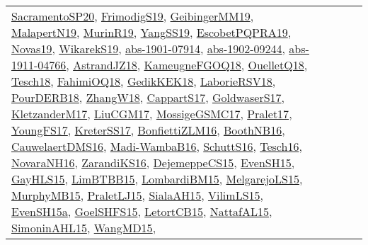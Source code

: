 {\begin{longtable}{llp{6cm}p{6cm}p{6cm}}
\href{articles/SacramentoSP20.pdf}{SacramentoSP20}\cite{SacramentoSP20}, \href{papers/FrimodigS19.pdf}{FrimodigS19}\cite{FrimodigS19}, \href{papers/GeibingerMM19.pdf}{GeibingerMM19}\cite{GeibingerMM19}, \href{papers/MalapertN19.pdf}{MalapertN19}\cite{MalapertN19}, \href{papers/MurinR19.pdf}{MurinR19}\cite{MurinR19}, \href{papers/YangSS19.pdf}{YangSS19}\cite{YangSS19}, \href{articles/EscobetPQPRA19.pdf}{EscobetPQPRA19}\cite{EscobetPQPRA19}, \href{articles/Novas19.pdf}{Novas19}\cite{Novas19}, \href{articles/WikarekS19.pdf}{WikarekS19}\cite{WikarekS19}, \href{articles/abs-1901-07914.pdf}{abs-1901-07914}\cite{abs-1901-07914}, \href{articles/abs-1902-09244.pdf}{abs-1902-09244}\cite{abs-1902-09244}, \href{articles/abs-1911-04766.pdf}{abs-1911-04766}\cite{abs-1911-04766}, \href{papers/AstrandJZ18.pdf}{AstrandJZ18}\cite{AstrandJZ18}, \href{papers/KameugneFGOQ18.pdf}{KameugneFGOQ18}\cite{KameugneFGOQ18}, \href{papers/OuelletQ18.pdf}{OuelletQ18}\cite{OuelletQ18}, \href{papers/Tesch18.pdf}{Tesch18}\cite{Tesch18}, \href{articles/FahimiOQ18.pdf}{FahimiOQ18}\cite{FahimiOQ18}, \href{articles/GedikKEK18.pdf}{GedikKEK18}\cite{GedikKEK18}, \href{articles/LaborieRSV18.pdf}{LaborieRSV18}\cite{LaborieRSV18}, \href{articles/PourDERB18.pdf}{PourDERB18}\cite{PourDERB18}, \href{articles/ZhangW18.pdf}{ZhangW18}\cite{ZhangW18}, \href{papers/CappartS17.pdf}{CappartS17}\cite{CappartS17}, \href{papers/GoldwaserS17.pdf}{GoldwaserS17}\cite{GoldwaserS17}, \href{papers/KletzanderM17.pdf}{KletzanderM17}\cite{KletzanderM17}, \href{papers/LiuCGM17.pdf}{LiuCGM17}\cite{LiuCGM17}, \href{papers/MossigeGSMC17.pdf}{MossigeGSMC17}\cite{MossigeGSMC17}, \href{papers/Pralet17.pdf}{Pralet17}\cite{Pralet17}, \href{papers/YoungFS17.pdf}{YoungFS17}\cite{YoungFS17}, \href{articles/KreterSS17.pdf}{KreterSS17}\cite{KreterSS17}, \href{papers/BonfiettiZLM16.pdf}{BonfiettiZLM16}\cite{BonfiettiZLM16}, \href{papers/BoothNB16.pdf}{BoothNB16}\cite{BoothNB16}, \href{papers/CauwelaertDMS16.pdf}{CauwelaertDMS16}\cite{CauwelaertDMS16}, \href{papers/Madi-WambaB16.pdf}{Madi-WambaB16}\cite{Madi-WambaB16}, \href{papers/SchuttS16.pdf}{SchuttS16}\cite{SchuttS16}, \href{papers/Tesch16.pdf}{Tesch16}\cite{Tesch16}, \href{articles/NovaraNH16.pdf}{NovaraNH16}\cite{NovaraNH16}, \href{articles/ZarandiKS16.pdf}{ZarandiKS16}\cite{ZarandiKS16}, \href{papers/DejemeppeCS15.pdf}{DejemeppeCS15}\cite{DejemeppeCS15}, \href{papers/EvenSH15.pdf}{EvenSH15}\cite{EvenSH15}, \href{papers/GayHLS15.pdf}{GayHLS15}\cite{GayHLS15}, \href{papers/LimBTBB15.pdf}{LimBTBB15}\cite{LimBTBB15}, \href{papers/LombardiBM15.pdf}{LombardiBM15}\cite{LombardiBM15}, \href{papers/MelgarejoLS15.pdf}{MelgarejoLS15}\cite{MelgarejoLS15}, \href{papers/MurphyMB15.pdf}{MurphyMB15}\cite{MurphyMB15}, \href{papers/PraletLJ15.pdf}{PraletLJ15}\cite{PraletLJ15}, \href{papers/SialaAH15.pdf}{SialaAH15}\cite{SialaAH15}, \href{papers/VilimLS15.pdf}{VilimLS15}\cite{VilimLS15}, \href{articles/EvenSH15a.pdf}{EvenSH15a}\cite{EvenSH15a}, \href{articles/GoelSHFS15.pdf}{GoelSHFS15}\cite{GoelSHFS15}, \href{articles/LetortCB15.pdf}{LetortCB15}\cite{LetortCB15}, \href{articles/NattafAL15.pdf}{NattafAL15}\cite{NattafAL15}, \href{articles/SimoninAHL15.pdf}{SimoninAHL15}\cite{SimoninAHL15}, \href{articles/WangMD15.pdf}{WangMD15}\cite{WangMD15}, 
\end{longtable}}
